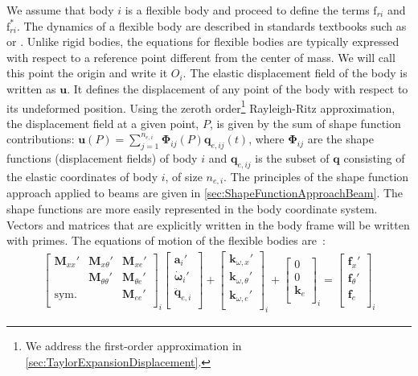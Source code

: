 \documentclass[wes, manuscript]{copernicus}
\renewcommand{\v}[1]{\boldsymbol{#1}}
\newcommand{\m}[1]{\boldsymbol{#1}}
\newcommand{\M} {{\m{M}}}
\newcommand{\kanef}{\mathrm{f}}
\begin{document}
We assume that body $i$ is a flexible body and proceed to define the terms $\kanef_{ri}$ and $\kanef_{ri}^*$.
The dynamics of a flexible body are described in standards textbooks 
such as \cite{shabana:book} or \cite{Schwertassek:book}.
Unlike rigid bodies, the equations for flexible bodies are typically expressed with respect to a reference point different from the center of mass.
We will call this point the origin and write it $O_i$.
The elastic displacement field of the body is written as $\v{u}$.
It defines the displacement of any point of the body with respect to its undeformed position.
Using the zeroth order\footnote{We address the first-order approximation in \autoref{sec:TaylorExpansionDisplacement}.} Rayleigh-Ritz approximation, the displacement field at a given point, $P$, is given by the sum of shape function contributions: $\v{u}(P)=\sum_{j=1}^{n_{e,i}} \v{\Phi}_{ij}(P) \v{q}_{e,ij}(t)$, where $\m{\Phi}_{ij}$ are the shape functions (displacement fields) of body $i$ and $\v{q}_{e,ij}$ is the subset of $\v{q}$ consisting of the elastic coordinates of body $i$, of size $n_{e,i}$.
The principles of the shape function approach applied to beams are given in \autoref{sec:ShapeFunctionApproachBeam}.
The shape functions are more easily represented in the body coordinate system.  
Vectors and matrices that are explicitly written in the body frame will be written with primes.
The equations of motion of the flexible bodies are~\citep{Wallrapp:1994}:
\begin{align}
    \begin{bmatrix}
       \M_{xx}'    & \M_{x \theta}' & \M_{ x e }' \\
                   & \M_{\theta \theta}'   & \M_{\theta e}'   \\
       \text{sym.} &            & \M_{e e}'  \\
    \end{bmatrix}_i
    \begin{bmatrix}
      \v{a}_i' \\
      \v{\dot{\omega}}_i' \\
      \v{\ddot{q}}_{e,i} \\
    \end{bmatrix}
      +
    \begin{bmatrix}
      \v{k}_{\omega, x}' \\
      \v{k}_{\omega, \theta}' \\
      \v{k}_{\omega, e}' \\
    \end{bmatrix}_i
      +
    \begin{bmatrix}
      0 \\
      0 \\
      \v{k}_{e}\\
    \end{bmatrix}_i
      =
    \begin{bmatrix}
      \v{f}_{x}' \\
      \v{f}_{\theta}' \\
      \v{f}_{e}\\
    \end{bmatrix}_i
    \label{eq:EOMFlexibleBody}
\end{align}
\end{document}
